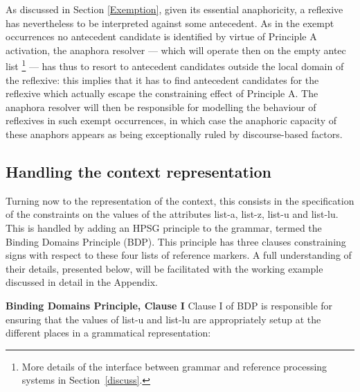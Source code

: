 \documentclass[output=paper
,modfonts
,nonflat]{langsci/langscibook}
\begin{document}
As discussed in Section \ref{Exemption}, given its essential anaphoricity,
a reflexive has nevertheless to be interpreted against some
antecedent. As in the exempt occurrences no antecedent candidate is 
identified by virtue of Principle A activation, the
anaphora resolver --- which will operate then on the empty {\sc antec} list%
%
\footnote{ 
More details of the
interface between grammar and reference processing systems in Section~\ref{discuss}.}
%
--- has thus to resort
to antecedent candidates outside the local domain of the
reflexive: this implies that it has to find
antecedent candidates for the reflexive which actually escape 
the constraining effect of Principle A. The anaphora resolver will then be
responsible for modelling the behaviour of reflexives 
in such exempt occurrences, in which case the
anaphoric capacity of these anaphors appears as being
exceptionally ruled by discourse-based factors.


\subsection{Handling the context representation}\label{contextRep}

Turning now to the representation of the context, this consists in the 
specification of the constraints on the values of the
attributes {\sc list-a}, {\sc list-z}, {\sc list-u}  and {\sc list-lu}. 
This is handled by adding
an HPSG principle to the grammar, termed 
the Binding Domains Principle (BDP). 
This principle has three
clauses constraining signs with respect to these four lists of reference
markers. A full understanding of their details, presented below, will be 
facilitated with the working example discussed in detail in the Appendix.

\textbf{Binding Domains Principle, Clause I} Clause I of BDP is responsible for ensuring
that the values of {\sc list-u} and \mbox{{\sc list-lu}} are appropriately
setup at the different places in a grammatical representation:
\end{document}
